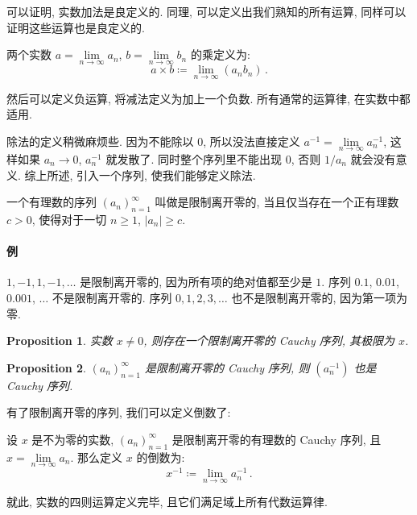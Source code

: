\documentclass[UTF8]{ctexart}
\theoremstyle{mystyle}
\newtheorem{proposition}{Proposition}[section]
\theoremstyle{myremark}
\theoremstyle{plain}
\begin{document}
可以证明, 实数加法是良定义的. 同理, 可以定义出我们熟知的所有运算, 同样可以证明这些运算也是良定义的.

\begin{definition}
    两个实数 $ a = \lim\limits_{n \to \infty} a_n $, $ b = \lim\limits_{n \to \infty} b_n $ 的乘定义为: \[ a \times b \coloneqq \lim\limits_{n \to \infty} (a_n b_n) \,.\]
\end{definition}

然后可以定义负运算, 将减法定义为加上一个负数. 所有通常的运算律, 在实数中都适用.

除法的定义稍微麻烦些. 因为不能除以 $ 0 $, 所以没法直接定义 $ a^{-1} = \lim\limits_{n \to \infty} a_n^{-1} $, 这样如果 $ a_n \to 0 $, $ a_n^{-1} $ 就发散了. 同时整个序列里不能出现 $ 0 $, 否则 $ 1/a_n $ 就会没有意义. 综上所述, 引入一个序列, 使我们能够定义除法.

\begin{definition}
    一个有理数的序列 $ (a_n)_{n = 1}^\infty $ 叫做是限制离开零的, 当且仅当存在一个正有理数 $ c > 0 $, 使得对于一切 $ n \geqslant 1 $, $ |a_n| \geqslant c $.
\end{definition}

\paragraph{例}
$ 1, -1, 1, -1, \dots $ 是限制离开零的, 因为所有项的绝对值都至少是 $ 1 $. 序列 $ 0.1 $, $0.01$, $0.001$, $\dots$ 不是限制离开零的. 序列 $ 0, 1, 2, 3, \dots $ 也不是限制离开零的, 因为第一项为零.


\begin{proposition}
    实数 $ x \neq 0 $, 则存在一个限制离开零的 Cauchy 序列, 其极限为 $ x $.
\end{proposition}

\begin{proposition}
    $ (a_n)_{n = 1}^\infty $ 是限制离开零的 Cauchy 序列, 则 $ (a_n^{-1}) $ 也是 Cauchy 序列.
\end{proposition}

有了限制离开零的序列, 我们可以定义倒数了:
\begin{definition}[\text{倒数}]
    设 $ x $ 是不为零的实数, $ (a_n)_{n = 1}^\infty $ 是限制离开零的有理数的 Cauchy 序列, 且 $ x = \lim\limits_{n \to \infty} a_n $. 那么定义 $ x $ 的倒数为: \[ x^{-1} \coloneqq \lim_{n \to \infty} a_n^{-1} \,.\]
\end{definition}

就此, 实数的四则运算定义完毕, 且它们满足域上所有代数运算律.
\end{document}
